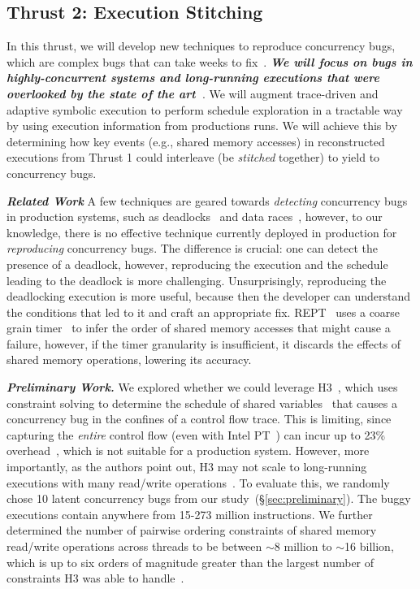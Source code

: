 \subsection{Thrust 2: Execution Stitching}
\label{sec:thrust2}

In this thrust, we will develop new techniques to reproduce concurrency bugs, which are complex bugs that can take weeks to fix~\cite{concurrencyAtMicrosoft}. \textbf{\textit{We will focus on bugs in highly-concurrent systems and long-running executions that were overlooked by the state of the art~\cite{h3,snorlax,rept}}}. We will augment trace-driven and adaptive symbolic execution to perform schedule exploration in a tractable way by using execution information from productions runs. We will achieve this by determining how key events (e.g., shared memory accesses) in reconstructed executions from Thrust 1 could interleave (be \textit{stitched} together) to yield to concurrency bugs. 

\noindent \textit{\textbf{Related Work}} A few techniques are geared towards \textit{detecting} concurrency bugs in production systems, such as deadlocks~\cite{jvmdeadlock,jstack} and data races~\cite{racemob}, however, to our knowledge, there is no effective technique currently deployed in production for \textit{reproducing} concurrency bugs. The difference is crucial: one can detect the presence of a deadlock, however, reproducing the execution and the schedule leading to the deadlock is more challenging. Unsurprisingly, reproducing the deadlocking execution is more useful, because then the developer can understand the conditions that led to it and craft an appropriate fix. REPT~\cite{rept} uses a coarse grain timer~\cite{snorlax} to infer the order of shared memory accesses that might cause a failure, however, if the timer granularity is insufficient, it discards the effects of shared memory operations, lowering its accuracy.

\noindent \textit{\textbf{Preliminary Work.}} We explored whether we could leverage H3~\cite{h3}, which uses constraint solving to determine the schedule of shared variables~\cite{clap} that causes a concurrency bug in the confines of a control flow trace. This is limiting, since capturing the \textit{entire} control flow (even with Intel PT~\cite{intelpt}) can incur up to 23\% overhead~\cite{h3}, which is not suitable for a production system. However, more importantly, as the authors point out, H3 may not scale to long-running executions with many read/write operations~\cite{h3}. To evaluate this, we randomly chose 10 latent concurrency bugs from our study~(\S\ref{sec:preliminary}). The buggy executions contain anywhere from 15-273 million instructions. We further determined the number of pairwise ordering constraints of shared memory read/write operations across threads to be between $\sim$8 million to $\sim$16 billion, which is up to six orders of magnitude greater than the largest number of constraints H3 was able to handle~\cite{h3}.

